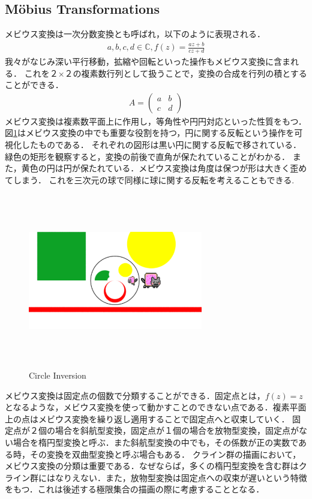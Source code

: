 \subsection{M\"obius Transformations}
メビウス変換は一次分数変換とも呼ばれ，以下のように表現される．
\begin{eqnarray*}
 a, b, c, d\in \mathbb{C}, f(z) = \frac{az + b}{cz + d}
\end{eqnarray*}
我々がなじみ深い平行移動，拡縮や回転といった操作もメビウス変換に含まれる．
これを２×２の複素数行列として扱うことで，変換の合成を行列の積とすることができる．
\begin{eqnarray*}
  A = \left(
    \begin{array}{ccc}
      a & b \\
      c & d
    \end{array}
  \right)
\end{eqnarray*}
メビウス変換は複素数平面上に作用し，等角性や円円対応といった性質をもつ．
図\ref{fig:circleInversion}はメビウス変換の中でも重要な役割を持つ，円に関する反転という操作を可視化したものである．
それぞれの図形は黒い円に関する反転で移されている．緑色の矩形を観察すると，変換の前後で直角が保たれていることがわかる．
また，黄色の円は円が保たれている．メビウス変換は角度は保つが形は大きく歪めてしまう．
これを三次元の球で同様に球に関する反転を考えることもできる. 
\begin{figure}[htbp]
 \begin{center}
      \includegraphics[width=3in, height=3in, keepaspectratio]{../img/klein/circleInversion.pdf}
    \caption{Circle Inversion}
    \label{fig:circleInversion}
 \end{center}
\end{figure}

メビウス変換は固定点の個数で分類することができる．固定点とは，$f(z) = z$となるような，メビウス変換を使って動かすことのできない点である．複素平面上の点はメビウス変換を繰り返し適用することで固定点へと収束していく．
固定点が２個の場合を斜航型変換，固定点が１個の場合を放物型変換，固定点がない場合を楕円型変換と呼ぶ．また斜航型変換の中でも，その係数が正の実数である時，その変換を双曲型変換と呼ぶ場合もある．
クライン群の描画において，メビウス変換の分類は重要である．なぜならば，多くの楕円型変換を含む群はクライン群にはなりえない．また，放物型変換は固定点への収束が遅いという特徴をもつ．これは後述する極限集合の描画の際に考慮することとなる．

